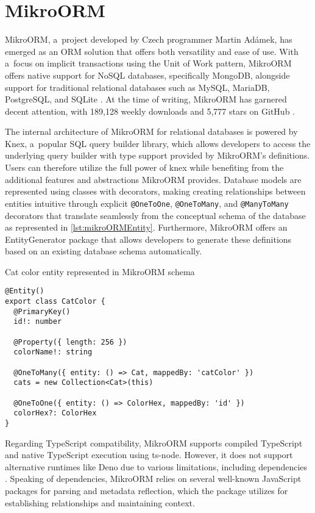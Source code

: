 \section{MikroORM}

MikroORM, a~project developed by Czech programmer Martin Adámek, has emerged as
an ORM solution that offers both versatility and ease of use. With a~focus on
implicit transactions using the Unit of Work pattern, MikroORM offers native
support for NoSQL databases, specifically MongoDB, alongside support for
traditional relational databases such as MySQL, MariaDB, PostgreSQL, and SQLite
\cite{mikroORMWeb}. At the time of writing, MikroORM has garnered decent
attention, with 189,128 weekly downloads and 5,777 stars on GitHub
\cite{mikroORMGitHub} \cite{mikroORMNpm}.

The internal architecture of MikroORM for relational databases is powered by
Knex, a~popular SQL query builder library, which allows developers to access the
underlying query builder with type support provided by MikroORM's definitions.
Users can therefore utilize the full power of knex while benefiting from the
additional features and abstractions MikroORM provides. Database models are
represented using classes with decorators, making creating relationships between
entities intuitive through explicit \texttt{@OneToOne}, \texttt{@OneToMany}, and
\texttt{@ManyToMany} decorators that translate seamlessly from the conceptual
schema of the database as represented in \autoref{lst:mikroORMEntity}.
Furthermore, MikroORM offers an EntityGenerator package that allows developers
to generate these definitions based on an existing database schema
automatically.

\begin{listing}
    \caption{Cat color entity represented in MikroORM schema}
    \label{lst:mikroORMEntity}
    \begin{verbatim}
@Entity()
export class CatColor {
  @PrimaryKey()
  id!: number

  @Property({ length: 256 })
  colorName!: string

  @OneToMany({ entity: () => Cat, mappedBy: 'catColor' })
  cats = new Collection<Cat>(this)

  @OneToOne({ entity: () => ColorHex, mappedBy: 'id' })
  colorHex?: ColorHex
}
    \end{verbatim}
\end{listing}

Regarding TypeScript compatibility, MikroORM supports compiled TypeScript and
native TypeScript execution using ts-node. However, it does not support
alternative runtimes like Deno due to various limitations, including
dependencies \cite{mikroORMDeno}. Speaking of dependencies, MikroORM relies on
several well-known JavaScript packages for parsing and metadata reflection,
which the package utilizes for establishing relationships and maintaining
context.

